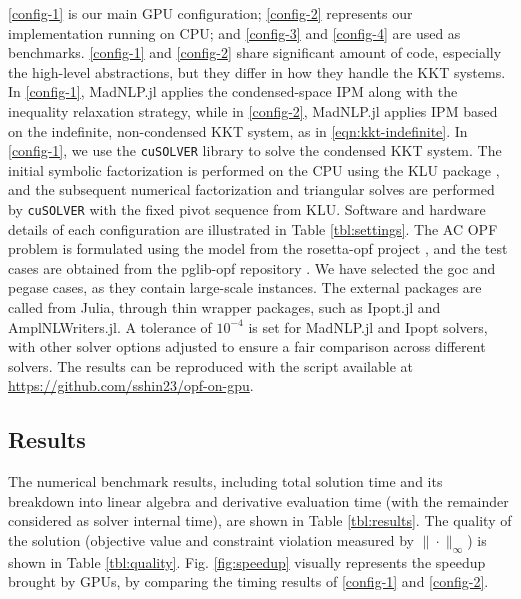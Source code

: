 \ref{config-1} is our main GPU configuration; \ref{config-2}
represents our implementation running on CPU; and \ref{config-3} and
\ref{config-4} are used as benchmarks. \ref{config-1} and
\ref{config-2} share significant amount of code, especially the
high-level abstractions, but they differ in how they handle the KKT
systems. In \ref{config-1}, MadNLP.jl applies the condensed-space IPM
along with the inequality relaxation strategy, while in
\ref{config-2}, MadNLP.jl applies IPM based on the indefinite,
non-condensed KKT system, as in \eqref{eqn:kkt-indefinite}. In
\ref{config-1}, we use the {\tt cuSOLVER} library to solve the condensed KKT
system. The initial symbolic factorization is performed on the CPU using the KLU
package \cite{davis2010algorithm}, and the subsequent numerical
factorization and triangular solves are performed by {\tt cuSOLVER} with the
fixed pivot sequence from KLU.  Software and hardware details of each
configuration are illustrated in Table \ref{tbl:settings}. The AC OPF
problem is formulated using the model from the rosetta-opf project
\cite{rosetta-opf}, and the test cases are obtained from the pglib-opf
repository \cite{babaeinejadsarookolaee2019power}. We have selected
the goc and pegase cases, as they contain large-scale instances.  The
external packages are called from Julia, through thin wrapper
packages, such as Ipopt.jl and AmplNLWriters.jl. A tolerance of
$10^{-4}$ is set for MadNLP.jl and Ipopt solvers, with other solver
options adjusted to ensure a fair comparison across different
solvers. The results can be reproduced with the script available at
\url{https://github.com/sshin23/opf-on-gpu}.

\subsection{Results}

The numerical benchmark results, including total solution time and its
breakdown into linear algebra and derivative evaluation time (with the
remainder considered as solver internal time), are shown in Table
\ref{tbl:results}. The quality of the solution (objective value and
constraint violation measured by $\|\cdot\|_\infty$) is shown in Table
\ref{tbl:quality}. Fig. \ref{fig:speedup} visually represents the
speedup brought by GPUs, by comparing the timing results of
\ref{config-1} and \ref{config-2}.


